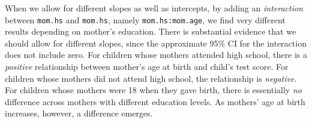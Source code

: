 \documentclass[addpoints,12pt]{exam}\usepackage[]{graphicx}\usepackage[]{xcolor}
\begin{document}
\begin{questions}
\begin{parts}
\begin{solution}
When we allow for different slopes as well as intercepts, by adding an \emph{interaction} between \texttt{mom.hs} and \texttt{mom.hs}, namely \texttt{mom.hs:mom.age}, we find very different results depending on mother's education. There is substantial evidence that we should allow for different slopes, since the approximate 95\% CI for the interaction does not include zero. For children whose mothers attended high school, there is a \emph{positive} relationship between mother's age at birth and child's test score. For children whose mothers did not attend high school, the relationship is \emph{negative}. For children whose mothers were 18 when they gave birth, there is essentially \emph{no} difference across mothers with different education levels. As mothers' age at birth increases, however, a difference emerges.
\end{solution}
	\end{parts}

\end{questions}
\end{document}
